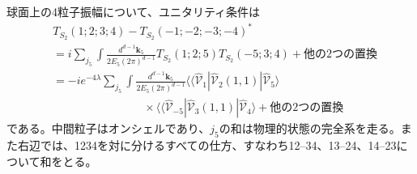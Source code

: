 球面上の4粒子振幅について、ユニタリティ条件は
\begin{equation}
 \begin{aligned}
 &T_{S_2}(1;2;3;4)-T_{S_2}(-1;-2;-3;-4)^*\\
 &=i\sum_{j_5}\int\frac{d^{d-1}\bm k_5}{2E_5(2\pi)^{d-1}}
 T_{S_2}(1;2;5)T_{S_2}(-5;3;4)
 +\text{他の2つの置換}\\
 &=-ie^{-4\lambda}\sum_{j_5}\int
 \frac{d^{d-1}\bm k_5}{2E_5(2\pi)^{d-1}}
 \langle\!\langle\widehat{\mathcal V}_1|
 \widehat{\mathcal V}_2(1,1)|\widehat{\mathcal V}_5\rangle\\
 &\hspace{8em}\times\langle\!\langle\widehat{\mathcal V}_{-5}|
 \widehat{\mathcal V}_3(1,1)|\widehat{\mathcal V}_4\rangle
 +\text{他の2つの置換}
 \end{aligned}
 \tag{9.1.24}\label{eq:9.1.24}
\end{equation}
である。中間粒子はオンシェルであり、$j_5$の和は物理的状態の完全系を走る。また右辺では、1234を対に分けるすべての仕方、すなわち12--34、13--24、14--23について和をとる。

